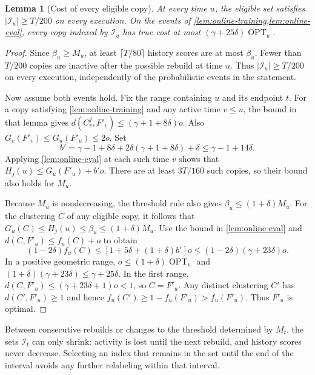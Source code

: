 \documentclass[11pt]{article}
\newtheorem{lemma}[theorem]{Lemma}
\newcommand{\OPT}{\operatorname{OPT}}
\begin{document}
\begin{lemma}[Cost of every eligible copy]\label{lem:online-eligible}
At every time $u$, the eligible set satisfies $|\mathcal I_u|\ge T/200$
on every execution. On the events of
\cref{lem:online-training,lem:online-eval}, every copy indexed by
$\mathcal I_u$ has true cost at most $(\gamma+25\delta)\OPT_u$.
\end{lemma}
\begin{proof}
Since $\beta_u\ge M_u$, at least $\lceil T/80\rceil$ history
scores are at most $\beta_u$. Fewer than $T/200$ copies are inactive
after the possible rebuild at time $u$. Thus
$|\mathcal I_u|\ge T/200$ on every execution, independently of the
probabilistic events in the statement.

Now assume both events hold.
Fix the range containing $u$ and its endpoint $t$. For a copy satisfying
\cref{lem:online-training} and any active time $v\le u$, the bound
in that lemma gives
$d(C^j_v,F'_v)\le(\gamma+1+8\delta)o$. Also
$G_v(F'_v)\le G_u(F'_u)\le2o$. Set
\[
 b'=\gamma-1+8\delta+2\delta(\gamma+1+8\delta)+\delta
 \le\gamma-1+14\delta.
\]
Applying \cref{lem:online-eval} at each such time $v$ shows that
$H_j(u)\le G_u(F'_u)+b'o$.
There are at least $3T/160$ such copies, so their bound also
holds for $M_u$.

Because $M_u$ is nondecreasing, the threshold rule also gives
$\beta_u\le(1+\delta)M_u$. For the clustering $C$ of any eligible
copy, it follows that $G_u(C)\le H_j(u)\le\beta_u\le(1+\delta)M_u$.
Use the bound in \cref{lem:online-eval} and $d(C,F'_u)\le f_u(C)+o$ to obtain
\[
 (1-2\delta)f_u(C)
 \le [1+5\delta+(1+\delta)b']o
 \le(1-2\delta)(\gamma+23\delta)o.
\]
In a positive geometric range, $o\le(1+\delta)\OPT_u$ and
$(1+\delta)(\gamma+23\delta)\le\gamma+25\delta$. In the first
range, $d(C,F'_u)\le(\gamma+23\delta+1)o<1$, so $C=F'_u$.
Any distinct clustering $C'$ has $d(C',F'_u)\ge1$ and hence
$f_u(C')\ge1-f_u(F'_u)>f_u(F'_u)$. Thus $F'_u$ is optimal.
\end{proof}

Between consecutive rebuilds or changes to the threshold determined by
$M_t$, the sets $\mathcal I_t$ can only shrink: activity is lost until the
next rebuild, and history scores never decrease. Selecting an index that
remains in the set until the end of the interval avoids any further
relabeling within that interval.
\end{document}
